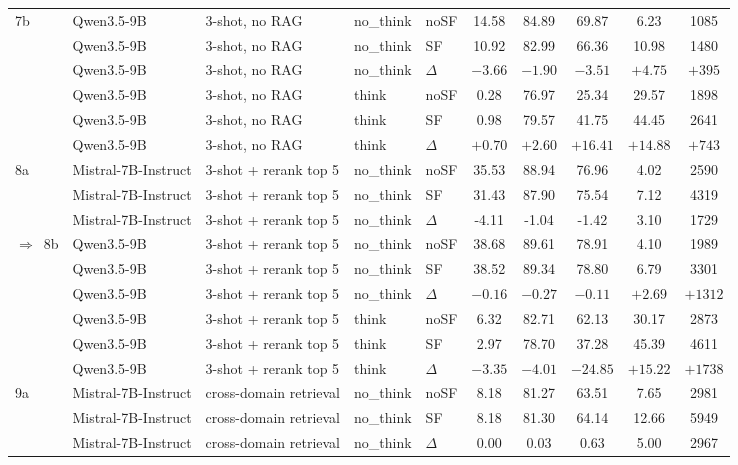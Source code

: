 \begin{scriptsize}
\begin{longtable}{l l l l l c c c c c}
7b & Qwen3.5-9B & 3-shot, no RAG & no\_think & noSF & 14.58 & 84.89 & 69.87 & 6.23 & 1085 \\
 & Qwen3.5-9B & 3-shot, no RAG & no\_think & SF & 10.92 & 82.99 & 66.36 & 10.98 & 1480 \\
 & Qwen3.5-9B & 3-shot, no RAG & no\_think & $\Delta$ & $-3.66$ & $-1.90$ & $-3.51$ & $+4.75$ & $+395$ \\
 & Qwen3.5-9B & 3-shot, no RAG & think & noSF & 0.28 & 76.97 & 25.34 & 29.57 & 1898 \\
 & Qwen3.5-9B & 3-shot, no RAG & think & SF & 0.98 & 79.57 & 41.75 & 44.45 & 2641 \\
 & Qwen3.5-9B & 3-shot, no RAG & think & $\Delta$ & $+0.70$ & $+2.60$ & $+16.41$ & $+14.88$ & $+743$ \\
\dmidrule
\rowcolor{tabhighlight}8a & Mistral-7B-Instruct & 3-shot + rerank top 5 & no\_think & noSF & 35.53 & 88.94 & 76.96 & 4.02 & 2590 \\
 & Mistral-7B-Instruct & 3-shot + rerank top 5 & no\_think & SF & 31.43 & 87.90 & 75.54 & 7.12 & 4319 \\
 & Mistral-7B-Instruct & 3-shot + rerank top 5 & no\_think & $\Delta$ & -4.11 & -1.04 & -1.42 & 3.10 & 1729 \\
\rowcolor{tabhighlight}$\Rightarrow$~8b & Qwen3.5-9B & 3-shot + rerank top 5 & no\_think & noSF & 38.68 & 89.61 & 78.91 & 4.10 & 1989 \\
 & Qwen3.5-9B & 3-shot + rerank top 5 & no\_think & SF & 38.52 & 89.34 & 78.80 & 6.79 & 3301 \\
 & Qwen3.5-9B & 3-shot + rerank top 5 & no\_think & $\Delta$ & $-0.16$ & $-0.27$ & $-0.11$ & $+2.69$ & $+1312$ \\
 & Qwen3.5-9B & 3-shot + rerank top 5 & think & noSF & 6.32 & 82.71 & 62.13 & 30.17 & 2873 \\
 & Qwen3.5-9B & 3-shot + rerank top 5 & think & SF & 2.97 & 78.70 & 37.28 & 45.39 & 4611 \\
 & Qwen3.5-9B & 3-shot + rerank top 5 & think & $\Delta$ & $-3.35$ & $-4.01$ & $-24.85$ & $+15.22$ & $+1738$ \\
\dmidrule
9a & Mistral-7B-Instruct & cross-domain retrieval & no\_think & noSF & 8.18 & 81.27 & 63.51 & 7.65 & 2981 \\
 & Mistral-7B-Instruct & cross-domain retrieval & no\_think & SF & 8.18 & 81.30 & 64.14 & 12.66 & 5949 \\
 & Mistral-7B-Instruct & cross-domain retrieval & no\_think & $\Delta$ & 0.00 & 0.03 & 0.63 & 5.00 & 2967 \\

\end{longtable}
\end{scriptsize}
